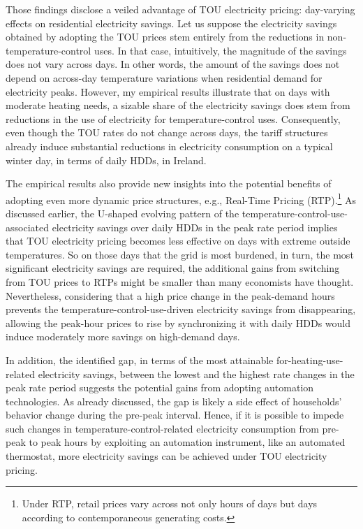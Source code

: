 Those findings disclose a veiled advantage of TOU electricity pricing: day-varying effects on residential electricity savings. Let us suppose the electricity savings obtained by adopting the TOU prices stem entirely from the reductions in non-temperature-control uses. In that case, intuitively, the magnitude of the savings does not vary across days. In other words, the amount of the savings does not depend on across-day temperature variations when residential demand for electricity peaks. However, my empirical results illustrate that on days with moderate heating needs, a sizable share of the electricity savings does stem from reductions in the use of electricity for temperature-control uses. Consequently, even though the TOU rates do not change across days, the tariff structures already induce substantial reductions in electricity consumption on a typical winter day, in terms of daily HDDs, in Ireland. 

The empirical results also provide new insights into the potential benefits of adopting even more dynamic price structures, e.g., Real-Time Pricing (RTP).\footnote{Under RTP, retail prices vary across not only hours of days but days according to contemporaneous generating costs.} As discussed earlier, the U-shaped evolving pattern of the temperature-control-use-associated electricity savings over daily HDDs in the peak rate period implies that TOU electricity pricing becomes less effective on days with extreme outside temperatures. So on those days that the grid is most burdened, in turn, the most significant electricity savings are required, the additional gains from switching from TOU prices to RTPs might be smaller than many economists have thought. Nevertheless, considering that a high price change in the peak-demand hours prevents the temperature-control-use-driven electricity savings from disappearing, allowing the peak-hour prices to rise by synchronizing it with daily HDDs would induce moderately more savings on high-demand days.

In addition, the identified gap, in terms of the most attainable for-heating-use-related electricity savings, between the lowest and the highest rate changes in the peak rate period suggests the potential gains from adopting automation technologies. As already discussed, the gap is likely a side effect of households' behavior change during the pre-peak interval. Hence, if it is possible to impede such changes in temperature-control-related electricity consumption from pre-peak to peak hours by exploiting an automation instrument, like an automated thermostat, more electricity savings can be achieved under TOU electricity pricing. 


